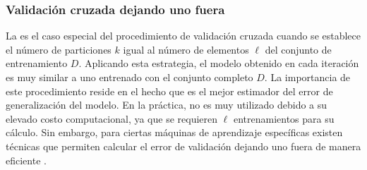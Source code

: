 %
\subsubsection{Validación cruzada dejando uno fuera}
%
La  es el caso especial del
procedimiento de validación cruzada cuando se establece el número de
particiones $k$ igual al número de elementos $\ell$ del conjunto de
entrenamiento $D$.
Aplicando esta estrategia, el modelo obtenido en cada iteración es muy
similar a uno entrenado con el conjunto completo $D$.
La importancia de este procedimiento reside en el hecho que es el
mejor estimador del error de generalización del modelo.
En la práctica, no es muy utilizado debido a su elevado costo
computacional, ya que se requieren $\ell$ entrenamientos para su
cálculo.
Sin embargo, para ciertas máquinas de aprendizaje específicas existen
técnicas que permiten calcular el error de validación dejando uno
fuera de manera eficiente \cite{chapelle,lee-keerthi}.
